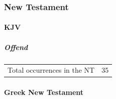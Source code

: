 			
		
		
	\subsubsection{New Testament} %
		\label{OFFENSE-NT}
	
		\paragraph{KJV}
			\label{OFFENSE-NT-KJV}
			
			\subparagraph{Offend}
	
				\begin{tabular}{ll}
					Total occurrences in the NT & 35
				\end{tabular}
				
				\begin{compactdesc}
					\item[{\hyperref[MATTHEW-11-6]{Matthew 11:6}}]
					\item[{\hyperref[MATTHEW-18-6]{Matthew 18:6--9}}]
				\end{compactdesc}
			
		\paragraph{Greek New Testament} %
			\label{OFFENSE-GREEK}
		
			\subparagraph{\texorpdfstring{}{}}
				\label{SKANDALIZO}
			
